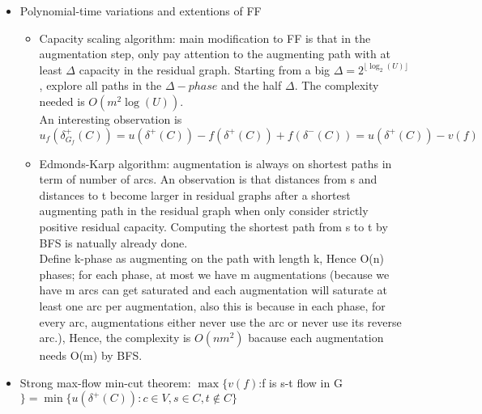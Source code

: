 \documentclass{article}
\begin{document}
\begin{itemize}
\begin{itemize}
\end{itemize}
\item Polynomial-time variations and extentions of FF
\begin{itemize}
\item Capacity scaling algorithm: main modification to FF is that in the augmentation step, only pay attention to the augmenting path with at least $\Delta$ capacity in the residual graph. Starting from a big $\Delta=2^{\lfloor\log_2(U)\rfloor}$, explore all paths in the $\Delta-phase$ and the half $\Delta$. The complexity needed is $O(m^2\log(U))$. \\
An interesting observation is $u_f(\delta_{G_f}^+(C)) = u(\delta^+(C)) - f(\delta^+(C)) + f(\delta^-(C)) = u(\delta^+(C)) -v(f)$
\item Edmonds-Karp algorithm: augmentation is always on shortest paths in term of number of arcs. An observation is that distances from s and distances to t become larger in residual graphs after a shortest augmenting path in the residual graph when only consider strictly positive residual capacity. Computing the shortest path from s to t by BFS is natually already done.\\
Define k-phase as augmenting on the path with length k, Hence O(n) phases; for each phase, at most we have m augmentations (because we have m arcs can get saturated and each augmentation will saturate at least one arc per augmentation, also this is because in each phase, for every arc, augmentations either never use the arc or never use its reverse arc.), Hence, the complexity is $O(nm^2)$ bacause each augmentation needs O(m) by BFS.
\end{itemize}
\item Strong max-flow min-cut theorem: $\max\{v(f)$:f is s-t flow in G$\}=\min\{u(\delta^+(C)):c\in V, s\in C, t\notin C\}$
\end{itemize}
\end{document}
